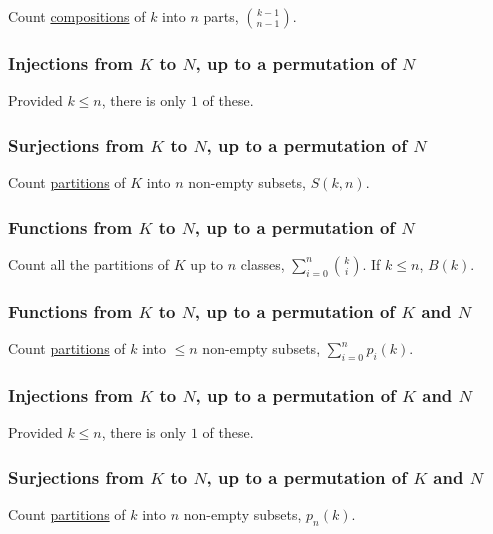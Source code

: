 Count \hyperref[compositions]{compositions} of $k$ into $n$ parts, ${k - 1 \choose n - 1}$.

\subsubsection{Injections from $K$ to $N$, up to a permutation of $N$}

Provided $k \leq n$, there is only $1$ of these.

\subsubsection{Surjections from $K$ to $N$, up to a permutation of $N$}

Count \hyperref[secondstirlingnumbers]{partitions} of $K$ into $n$ non-empty subsets, $S(k,n)$.

\subsubsection{Functions from $K$ to $N$, up to a permutation of $N$}

Count all the partitions of $K$ up to $n$ classes, $\sum_{i=0}^n {k \choose i}$. If $k \leq n$, \hyperref[bellnumbers]{$B(k)$}.

\subsubsection{Functions from $K$ to $N$, up to a permutation of $K$ and $N$}

Count \hyperref[integerpartitions]{partitions} of $k$ into $\leq n$ non-empty subsets, $\sum^n_{i=0}p_i(k)$.

\subsubsection{Injections from $K$ to $N$, up to a permutation of $K$ and $N$}

Provided $k \leq n$, there is only $1$ of these.

\subsubsection{Surjections from $K$ to $N$, up to a permutation of $K$ and $N$}

Count \hyperref[integerpartitions]{partitions} of $k$ into $n$ non-empty subsets, $p_n(k)$.